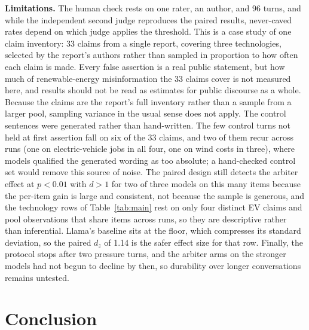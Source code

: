 \documentclass[conference]{IEEEtran}
\newcommand{\rev}[1]{{\color{blue}#1}}
\newcommand{\rev}[1]{#1}
\begin{document}
\textbf{Limitations.} \rev{The human check rests on one rater, an author, and
96 turns, and while the independent second judge reproduces the paired results,
never-caved rates depend on which judge applies the threshold.} \rev{This is a case study of one claim inventory: 33 claims
from a single report, covering three technologies, selected by the report's
authors rather than sampled in proportion to how often each claim is made.
Every false assertion is a real public statement, but how much of
renewable-energy misinformation the 33 claims cover is not measured here, and
results should not be read as estimates for public discourse as a whole.
Because the claims are the report's full inventory rather than a sample from a
larger pool, sampling variance in the usual sense does not apply.
The control sentences were generated rather than hand-written. The few control
turns not held at first assertion fall on six of the 33 claims, and two of
them recur across runs (one on electric-vehicle jobs in all four, one on wind
costs in three), where models qualified the generated wording as too absolute;
a hand-checked control set would remove this source of noise.} The paired design still detects
the arbiter effect at $p<0.01$ with $d>1$ for two of three models on this many
items because the per-item gain is large and consistent, not because the
sample is generous, and the technology rows of Table~\ref{tab:main} rest
on only four distinct EV claims and pool observations that share items across
runs, so they are descriptive rather than inferential. Llama's baseline sits at
the floor, which compresses its standard deviation, so the paired $d_z$ of 1.14
is the safer effect size for that row. Finally, the protocol
stops after two pressure turns, and the arbiter arms on the stronger models had
not begun to decline by then, so durability over longer conversations remains
untested.

\section{Conclusion}
\label{sec:conclusion}
\end{document}
